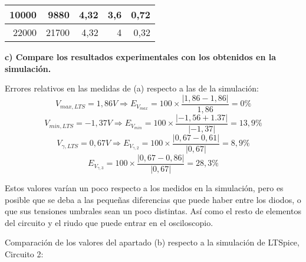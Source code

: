 \documentclass{article}
\begin{document}
\begin{table}[ht!]
\begin{tabular}{|r|r|r|r|r|}
10000                                  & 9880                                             & 4,32                               & 3,6                                                     & 0,72                         \\ \hline
22000                                  & 21700                                            & 4,32                               & 4                                                       & 0,32                         \\ \hline
\end{tabular}
\end{table}

\bigskip
\textbf{c) Compare los resultados experimentales con los obtenidos en la simulación.}

Errores relativos en las medidas de (a) respecto a las de la simulación: 
$$V_{max, LTS} = 1,86V\Rightarrow E_{V_{max}}=100\times \frac{|1,86-1,86|}{1,86}=0\%$$
$$V_{min, LTS} = -1,37V\Rightarrow E_{V_{min}}=100\times \frac{|-1,56+1.37|}{|-1,37|}=13,9\%$$
$$V_{\gamma, LTS} = 0,67V\Rightarrow E_{V_{\gamma, 2}}=100\times \frac{|0,67-0,61|}{|0,67|}=8,9\%$$
$$E_{V_{\gamma, 3}}=100\times \frac{|0,67-0,86|}{|0,67|}=28,3\%$$

Estos valores varían un poco respecto a los medidos en la simulación, pero es posible que se deba a las pequeñas diferencias que puede haber entre los diodos, o que sus tensiones umbrales sean un poco distintas. Así como el resto de elementos del circuito y el riudo que puede entrar en el osciloscopio.

\bigskip
Comparación de los valores del apartado (b) respecto a la simulación de LTSpice, Circuito 2:
\end{document}
